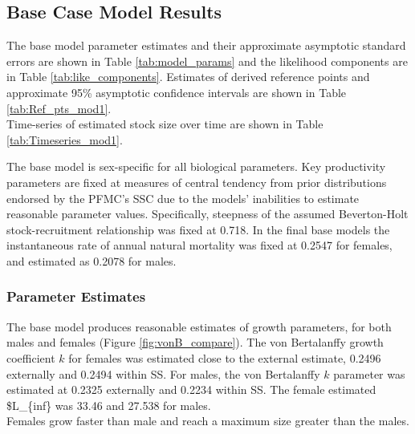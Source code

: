 \documentclass[12pt,]{article}
\begin{document}
\subsection{Base Case Model Results}\label{base-case-model-results}

The base model parameter estimates and their approximate asymptotic
standard errors are shown in Table \ref{tab:model_params} and the
likelihood components are in Table \ref{tab:like_components}. Estimates
of derived reference points and approximate 95\% asymptotic confidence
intervals are shown in Table \ref{tab:Ref_pts_mod1}.\\
Time-series of estimated stock size over time are shown in Table
\ref{tab:Timeseries_mod1}.

The base model is sex-specific for all biological parameters. Key
productivity parameters are fixed at measures of central tendency from
prior distributions endorsed by the PFMC's SSC due to the models'
inabilities to estimate reasonable parameter values. Specifically,
steepness of the assumed Beverton-Holt stock-recruitment relationship
was fixed at 0.718. In the final base models the instantaneous rate of
annual natural mortality was fixed at 0.2547 for females, and estimated
as 0.2078 for males.

\subsubsection{Parameter Estimates}\label{parameter-estimates}

The base model produces reasonable estimates of growth parameters, for
both males and females (Figure \ref{fig:vonB_compare}). The von
Bertalanffy growth coefficient \(k\) for females was estimated close to
the external estimate, 0.2496 externally and 0.2494 within SS. For
males, the von Bertalanffy \(k\) parameter was estimated at 0.2325
externally and 0.2234 within SS. The female estimated \$L\_\{inf\} was
33.46 and 27.538 for males.\\
Females grow faster than male and reach a maximum size greater than the
males.
\end{document}
